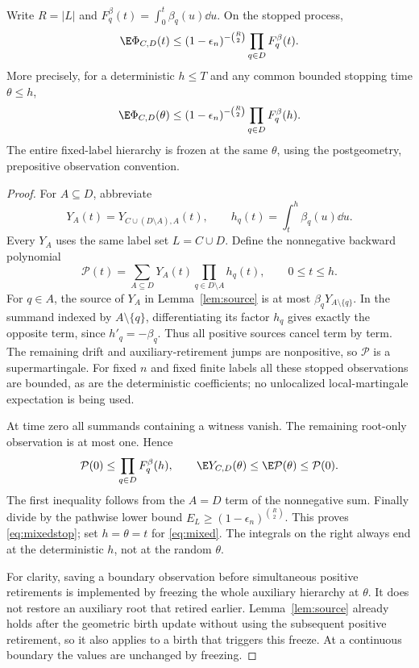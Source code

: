 \begin{proposition}\label{prop:mixed}
Write \(R=|L|\) and \(F_q^\beta(t)=\int_0^t\beta_q(u)\dd u\).
On the stopped process,
\begin{equation}\label{eq:mixed}
 \E\Phi_{C,D}(t)\le
 (1-\epsilon_n)^{-\binom R2}\prod_{q\in D}F_q^\beta(t).
\end{equation}
More precisely, for a deterministic \(h\le T\) and any common
bounded stopping time \(\theta\le h\),
\begin{equation}\label{eq:mixedstop}
 \E\Phi_{C,D}(\theta)\le
 (1-\epsilon_n)^{-\binom R2}\prod_{q\in D}F_q^\beta(h).
\end{equation}
The entire fixed-label hierarchy is frozen at the same \(\theta\),
using the postgeometry, prepositive observation convention.
\end{proposition}
\begin{proof}
For \(A\subseteq D\), abbreviate
\[
 Y_A(t)=Y_{C\cup(D\setminus A),A}(t),\qquad
 h_q(t)=\int_t^h\beta_q(u)\dd u.
\]
Every \(Y_A\) uses the same label set \(L=C\cup D\). Define the
nonnegative backward polynomial
\begin{equation}\label{eq:backwardpoly}
 \mathcal P(t)=\sum_{A\subseteq D}Y_A(t)
                  \prod_{q\in D\setminus A}h_q(t),
 \qquad 0\le t\le h.
\end{equation}
For \(q\in A\), the source of \(Y_A\) in Lemma~\ref{lem:source}
is at most \(\beta_qY_{A\setminus\{q\}}\). In the summand indexed
by \(A\setminus\{q\}\), differentiating its factor \(h_q\)
gives exactly the opposite term, since \(h'_q=-\beta_q\).
Thus all positive sources cancel term by term. The remaining
drift and auxiliary-retirement jumps are nonpositive, so
\(\mathcal P\) is a supermartingale. For fixed \(n\) and fixed
finite labels all these stopped observations are bounded, as are
the deterministic coefficients; no unlocalized local-martingale
expectation is being used.

At time zero all summands containing a witness vanish. The remaining
root-only observation is at most one. Hence
\[
 \mathcal P(0)\le\prod_{q\in D}F_q^\beta(h),\qquad
 \E Y_{C,D}(\theta)\le\E\mathcal P(\theta)\le\mathcal P(0).
\]
The first inequality follows from the \(A=D\) term of the
nonnegative sum. Finally divide by the pathwise lower bound
\(E_L\ge(1-\epsilon_n)^{\binom R2}\). This proves
\eqref{eq:mixedstop}; set \(h=\theta=t\) for \eqref{eq:mixed}.
The integrals on the right always end at the deterministic \(h\),
not at the random \(\theta\).

For clarity, saving a boundary observation before simultaneous
positive retirements is implemented by freezing the whole auxiliary
hierarchy at \(\theta\). It does not restore an auxiliary root
that retired earlier. Lemma~\ref{lem:source} already holds after
the geometric birth update without using the subsequent positive
retirement, so it also applies to a birth that triggers this freeze.
At a continuous boundary the values are unchanged by freezing.
\end{proof}

